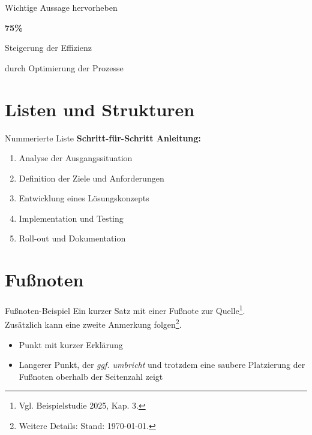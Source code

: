 \documentclass[aspectratio=169,10pt]{beamer}
\begin{document}
\begin{frame}{Wichtige Aussage hervorheben}
\begin{center}
  \vspace{1cm}
  {\Huge \textcolor{HMRed}{\textbf{75\%}}}
  
  \vspace{0.5cm}
  {\Large Steigerung der Effizienz}
  
  \vspace{0.5cm}
  durch Optimierung der Prozesse
\end{center}
\end{frame}

\section{Listen und Strukturen}
\begin{frame}{Nummerierte Liste}
\textbf{Schritt-für-Schritt Anleitung:}
\begin{enumerate}
  \item Analyse der Ausgangssituation
  \item Definition der Ziele und Anforderungen
  \item Entwicklung eines Lösungskonzepts
  \item Implementation und Testing
  \item Roll-out und Dokumentation
\end{enumerate}
\end{frame}

\section{Fu\ss{}noten}
\begin{frame}{Fu\ss{}noten-Beispiel}
Ein kurzer Satz mit einer Fu\ss{}note zur Quelle\footnote{Vgl. Beispielstudie 2025, Kap. 3.}. \\
Zus\"atzlich kann eine zweite Anmerkung folgen\footnote{Weitere Details: Stand: \today.}.

\vspace{0.5\baselineskip}
\begin{itemize}
  \item Punkt mit kurzer Erkl\"arung
  \item Langerer Punkt, der \textit{ggf. umbricht} und trotzdem eine saubere
  Platzierung der Fu\ss{}noten oberhalb der Seitenzahl zeigt
\end{itemize}
\end{frame}
\end{document}
